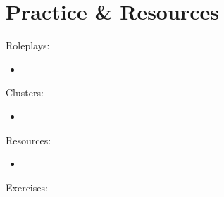 \chapter{Practice \& Resources}

Roleplays:
\begin{itemize}
    \item 
\end{itemize}

Clusters:
\begin{itemize}
    \item 
\end{itemize}

Resources:
\begin{itemize}
    \item 
\end{itemize}

Exercises: